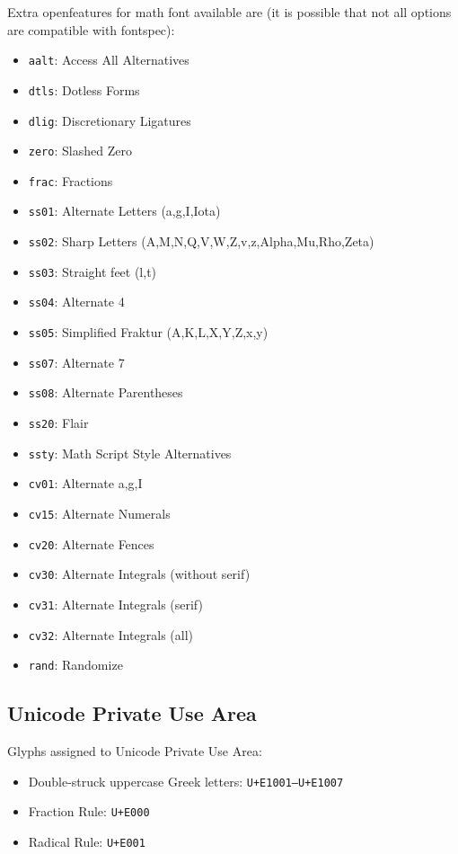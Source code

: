 \documentclass[a4paper]{scrartcl}
\newcommand*{\opt}[1]{\texttt{#1}}
\begin{document}
Extra openfeatures for math font available are (it is possible that not all options are compatible with fontspec):

\begin{itemize}
  \item \opt{aalt}: Access All Alternatives
  \item \opt{dtls}: Dotless Forms
  \item \opt{dlig}: Discretionary Ligatures
  \item \opt{zero}: Slashed Zero
  \item \opt{frac}: Fractions
  \item \opt{ss01}: Alternate Letters (a,g,I,Iota)
  \item \opt{ss02}: Sharp Letters (A,M,N,Q,V,W,Z,v,z,Alpha,Mu,Rho,Zeta)
  \item \opt{ss03}: Straight feet (l,t)
  \item \opt{ss04}: Alternate 4
  \item \opt{ss05}: Simplified Fraktur (A,K,L,X,Y,Z,x,y)
  \item \opt{ss07}: Alternate 7
  \item \opt{ss08}: Alternate Parentheses
  \item \opt{ss20}: Flair
  \item \opt{ssty}: Math Script Style Alternatives
  \item \opt{cv01}: Alternate a,g,I
  \item \opt{cv15}: Alternate Numerals
  \item \opt{cv20}: Alternate Fences
  \item \opt{cv30}: Alternate Integrals (without serif)
  \item \opt{cv31}: Alternate Integrals (serif)
  \item \opt{cv32}: Alternate Integrals (all)
  \item \opt{rand}: Randomize
\end{itemize}

\subsection{Unicode Private Use Area}

Glyphs assigned to Unicode Private Use Area:

\begin{itemize}
	\item Double-struck uppercase Greek letters: \opt{U+E1001–U+E1007}
	\item Fraction Rule: \opt{U+E000}
	\item Radical Rule: \opt{U+E001}
\end{itemize}
\end{document}
